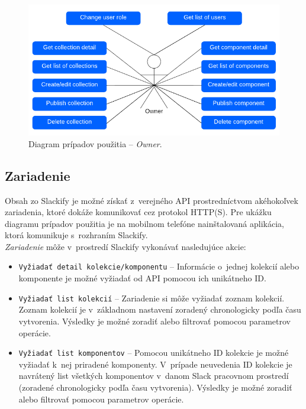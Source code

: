 \begin{figure}[H]
	\centering
	\includegraphics[scale=0.9]{obrazky-figures/owner_use_case}
	\caption{Diagram prípadov použitia -- \emph{Owner}.}
\end{figure}

\subsection{Zariadenie}
Obsah zo Slackify je možné získať z~verejného API prostredníctvom akéhokoľvek zariadenia, ktoré dokáže komunikovať cez protokol HTTP(S). Pre ukážku diagramu prípadov použitia je na mobilnom telefóne nainštalovaná aplikácia, ktorá komunikuje s~rozhraním Slackify. \\

\noindent \emph{Zariadenie} môže v~prostredí Slackify vykonávať nasledujúce akcie:

\begin{itemize}
	\item \texttt{Vyžiadať detail kolekcie/komponentu} -- Informácie o~jednej kolekcií alebo komponente je možné vyžiadať od API pomocou ich unikátneho ID.
	\item \texttt{Vyžiadať list kolekcií} -- Zariadenie si môže vyžiadať zoznam kolekcií. Zoznam kolekcií je v~základnom nastavení zoradený chronologicky podľa času vytvorenia. Výsledky je možné zoradiť alebo filtrovať pomocou parametrov operácie.
	\item \texttt{Vyžiadať list komponentov} -- Pomocou unikátneho ID kolekcie je možné vyžiadať k~nej priradené komponenty. V~prípade neuvedenia ID kolekcie je navrátený list všetkých komponentov v~danom Slack pracovnom prostredí (zoradené chronologicky podľa času vytvorenia). Výsledky je možné zoradiť alebo filtrovať pomocou parametrov operácie.
\end{itemize}

